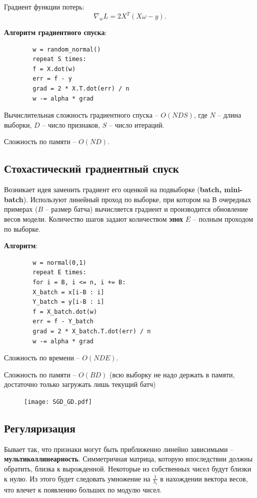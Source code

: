 \documentclass[a4paper, 10pt, openany]{book} %
\begin{document}
	Градиент функции потерь:
	\begin{equation*}
		\nabla_w L = 2 X^T \left(X\omega - y\right).
	\end{equation*}
	
	\textbf{Алгоритм градиентного спуска}:
	\begin{lstlisting}
		w = random_normal()
		repeat S times:
		f = X.dot(w)
		err = f - y
		grad = 2 * X.T.dot(err) / n
		w -= alpha * grad
	\end{lstlisting}
	
	Вычислительная сложность градиентного спуска -- $O(NDS)$, где $N$ -- длина выборки, $D$ -- число признаков, $S$ -- число итераций.
	
	Сложность по памяти -- $O(ND)$.
	
	\subsection{Стохастический градиентный спуск}
	
	Возникает идея заменить градиент его оценкой на подвыборке (\textbf{batch, mini-batch}). Используют линейный проход по выборке, при котором на $В$ очередных примерах ($B$ -- размер батча) вычисляется градиент и производится обновление весов модели. Количество шагов задают количеством \textbf{эпох} $E$ -- полным проходом по выборке.
	
	\textbf{Алгоритм}:
	\begin{lstlisting}
		w = normal(0,1)
		repeat E times:
		for i = B, i <= n, i += B:
		X_batch = x[i-B : i]
		Y_batch = y[i-B : i]
		f = X_batch.dot(w)
		err = f - Y_batch
		grad = 2 * X_batch.T.dot(err) / n
		w -= alpha * grad
	\end{lstlisting}
	
	Сложность по времени -- $O(NDE)$.
	
	Сложность по памяти -- $O(BD)$ (всю выборку не надо держать в памяти, достаточно только загружать лишь текущий батч)
	
	\newpage
	
	\begin{figure}[h!]
		\centering
		\texttt{[image: SGD\_GD.pdf]}
	\end{figure}
	
	\subsection{Регуляризация}
	
	Бывает так, что признаки могут быть приближенно линейно зависимыми -- \textbf{мультиколлинеарность}. Симметричная матрица, которую впоследствии должны обратить, близка к вырожденной. Некоторые из собственных чисел будут близки к нулю. Из этого будет следовать умножение на $\frac{1}{\lambda_i}$ в нахождении вектора весов, что влечет к появлению больших по модулю чисел.
	
\end{document}
